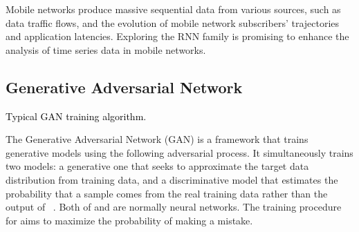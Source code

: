 \documentclass[journal,comsoc,letter]{IEEEtran}
\newcommand{\rev}[1]{\textcolor{black}{#1}}
\begin{document}
Mobile networks produce massive sequential data from various sources, such as data traffic flows, and the evolution of mobile network subscribers' trajectories and application latencies. Exploring the RNN family is promising to enhance the analysis of time series data in mobile networks.  

\subsection{Generative Adversarial Network}
\begin{algorithm}[t]
  \caption{\rev{Typical GAN training algorithm. \label{alg:gan}}}
  \label{tra_gan}
  \begin{algorithmic}[1]
  \color{black}
    \label{ln:bigloop}
     \label{ln:loopd}
        	 \label{ln:sampling1}
        	 \label{ln:sampling1}
               \State{}\label{ln:grad1}
                \label{ln:adam1}
	\EndFor
           \State{}
           \label{ln:adam2}
    \EndWhile
    \end{algorithmic}
\end{algorithm}
The Generative Adversarial Network (GAN) is a framework that trains generative models using the following adversarial process. It simultaneously trains two models: a generative one  that seeks to approximate the target data distribution from training data, and a discriminative model  that estimates the probability that a sample comes from the real training data rather than the output of ~\cite{goodfellow2014generative}.  Both of  and   are normally neural networks. The training procedure for  aims to maximize the probability of  making a mistake. 
\end{document}
